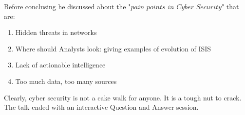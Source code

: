 \documentclass{article}
\begin{document}
Before conclusing he discussed about the "$pain$ $points$ $in$ $Cyber$ $Security$" that are:
\begin{enumerate}
\item Hidden threats in networks
\item Where should Analysts look: giving examples of evolution of ISIS
\item Lack of actionable intelligence
\item Too much data, too many sources
\end{enumerate}

Clearly, cyber security is not a cake walk for anyone. It is a tough nut to crack. The talk ended with an interactive Question and Answer session.



	


	
\end{document}

